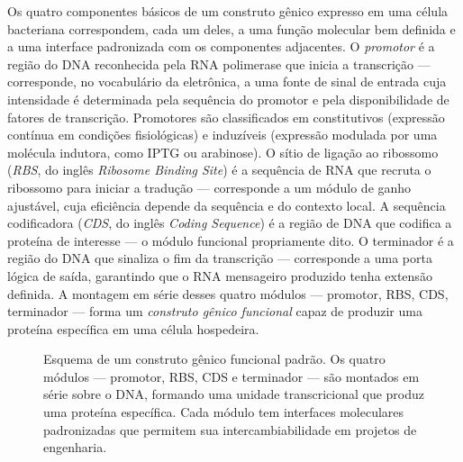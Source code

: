 Os quatro componentes básicos de um construto gênico expresso em uma célula bacteriana correspondem, cada um deles, a uma função molecular bem definida e a uma interface padronizada com os componentes adjacentes. O \emph{promotor} é a região do DNA reconhecida pela RNA polimerase que inicia a transcrição --- corresponde, no vocabulário da eletrônica, a uma fonte de sinal de entrada cuja intensidade é determinada pela sequência do promotor e pela disponibilidade de fatores de transcrição. Promotores são classificados em constitutivos (expressão contínua em condições fisiológicas) e induzíveis (expressão modulada por uma molécula indutora, como IPTG ou arabinose). O sítio de ligação ao ribossomo (\emph{RBS}, do inglês \emph{Ribosome Binding Site}) é a sequência de RNA que recruta o ribossomo para iniciar a tradução --- corresponde a um módulo de ganho ajustável, cuja eficiência depende da sequência e do contexto local. A sequência codificadora (\emph{CDS}, do inglês \emph{Coding Sequence}) é a região de DNA que codifica a proteína de interesse --- o módulo funcional propriamente dito. O terminador é a região do DNA que sinaliza o fim da transcrição --- corresponde a uma porta lógica de saída, garantindo que o RNA mensageiro produzido tenha extensão definida. A montagem em série desses quatro módulos --- promotor, RBS, CDS, terminador --- forma um \emph{construto gênico funcional} capaz de produzir uma proteína específica em uma célula hospedeira.

\begin{figure}[htbp]
\centering
{}
\caption{Esquema de um construto gênico funcional padrão. Os quatro módulos --- promotor, RBS, CDS e terminador --- são montados em série sobre o DNA, formando uma unidade transcricional que produz uma proteína específica. Cada módulo tem interfaces moleculares padronizadas que permitem sua intercambiabilidade em projetos de engenharia.}
\label{fig:14-construto}
\end{figure}

